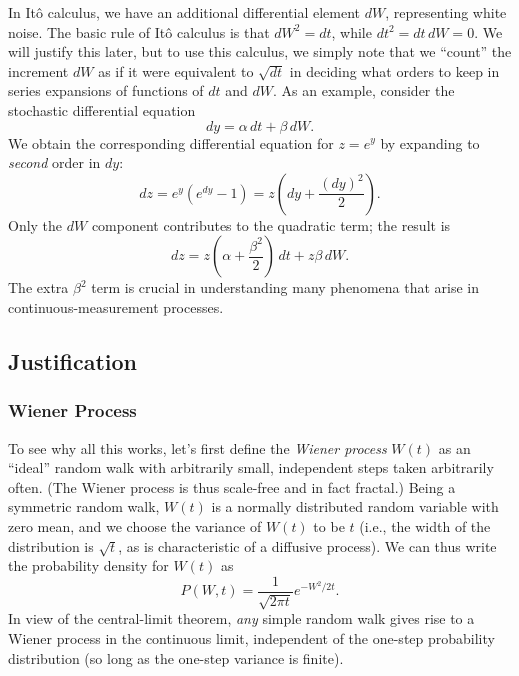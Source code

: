 \documentclass[aps,twocolumn,superscriptaddress,footinbib,floatfix,showpacs]{revtex4}
\begin{document}
In It\^o calculus, we have an additional differential element $dW$,
representing white noise.  The basic rule of It\^o calculus is
that $dW^2=dt$, while $dt^2=dt\,dW = 0$.  We will justify this
later, but to use this calculus, we simply note that we ``count''
the increment $dW$ as if it were equivalent to $\sqrt{dt}$ in
deciding what orders to keep in series expansions
of functions of $dt$ and $dW$.
As an example, consider the stochastic differential equation
\begin{equation}
  dy = \alpha\,dt+\beta\,dW.
  \label{exampley}
\end{equation}
We obtain the corresponding differential equation for $z=e^y$
by expanding to \textit{second} order in $dy$:
\begin{equation}
  dz = e^y\left(e^{dy}-1\right) = z\left(dy+\frac{(dy)^2}{2}\right).
\end{equation}
Only the $dW$ component contributes to the quadratic term; the
result is
\begin{equation}
  dz = z\left(\alpha+ \frac{\beta^2}{2}\right)\,dt + z\beta\,dW.
\end{equation}
The extra $\beta^2$ term is crucial in understanding many phenomena
that arise in continuous-measurement processes.


\subsection{Justification}

\subsubsection{Wiener Process}\label{section:wienerprocess}
To see why all this works, let's first define the \textit{Wiener process}
$W(t)$ as an ``ideal'' random walk with arbitrarily small, independent 
steps taken arbitrarily often.  (The Wiener process is thus
scale-free and in fact fractal.)  Being a symmetric random walk, $W(t)$ is 
a normally distributed random variable with zero mean, 
and we choose
the variance of $W(t)$ to be $t$ (i.e., the width of the 
distribution is $\sqrt{t}$, as is characteristic of a diffusive process).
We can thus write the probability density for $W(t)$ as
\begin{equation}
  P(W,t) = \frac{1}{\sqrt{2\pi t}} e^{-W^2/2t}.
  \label{gaussprobW}
\end{equation}
In view of the central-limit theorem, \textit{any} simple random
walk gives rise to a Wiener process in the continuous limit, independent
of the one-step probability distribution (so long as the one-step
variance is finite).
\end{document}
